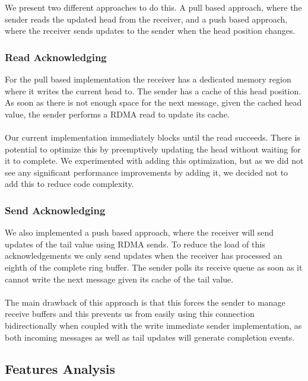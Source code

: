 We present two different approaches to do this. A pull based approach, where the sender reads the updated head from the
receiver, and a push based approach, where the receiver sends updates to the sender when the head position changes.

\subsubsection{Read Acknowledging}
For the pull based implementation the receiver has a dedicated memory region where it writes the current 
head to. The sender has a cache of this head position. As soon as there is not enough space for the next message, given 
the cached head value, the sender performs a RDMA read to update its cache.

\paragraph{} Our current implementation immediately blocks until the read succeeds. There is potential to optimize this by preemptively 
updating the head without waiting for it to complete. We experimented with adding this optimization, but as we did not see any significant 
performance improvements by adding it, we decided not to add this to reduce code complexity. 

\subsubsection{Send Acknowledging} 

We also implemented a push based approach, where the receiver will send updates of the tail value using 
RDMA sends. To reduce the load of this acknowledgements we only send updates when the receiver has processed an eighth of 
the complete ring buffer. The sender polls its receive queue as soon as it cannot write the next message given its
cache of the tail value.

\paragraph{} The main drawback of this approach is that this forces the sender to manage receive buffers and this prevents
us from easily using this connection bidirectionally when coupled with the write immediate sender implementation, as both 
incoming messages as well as tail updates will generate completion events.

\subsection{Features Analysis}

